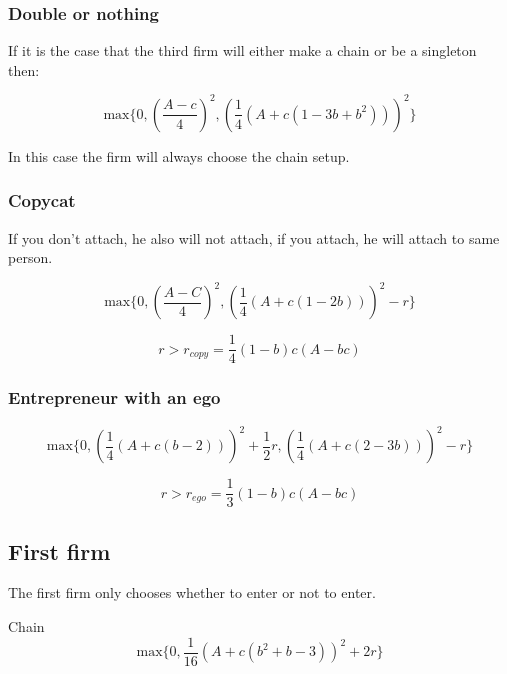 \documentclass{article}
\begin{document}
\subsubsection{Double or nothing}

If it is the case that the third firm will either make a chain or be a singleton then: 

\begin{equation*}
\text{max} \{ 
0, \left(\frac{A-c}{4} \right)^2, \left(\frac{1}{4}(A+c(1-3b+b^2)) \right)^2
\}
\end{equation*}

In this case the firm will always choose the chain setup. 

\subsubsection{Copycat}

If you don't attach, he also will not attach, if you attach, he will attach to same person. 

\begin{equation*}
\text{max} \{ 
0,  \left(\frac{A-C}{4} \right)^2, \left( \frac{1}{4}(A+c(1-2b)) \right)^2-r
\}
\end{equation*}

\begin{equation*}
r> r_{copy}=\frac{1}{4} (1-b) c (A-b c)
\end{equation*}

\subsubsection{Entrepreneur with an ego}

\begin{equation*}
\text{max} \{ 
0, \left(\frac{1}{4}(A+ c(b-2)) \right)^2+\frac{1}{2}r, \left( \frac{1}{4} (A+c(2-3b) )\right)^2-r
\}
\end{equation*}

\begin{equation*}
r> r_{ego} = \frac{1}{3} (1-b) c (A-b c)
\end{equation*}

\subsection{First firm}

The first firm only chooses whether to enter or not to enter. 

Chain
\begin{equation*}
\text{max} \{ 
0, \frac{1}{16} \left(A+c(b^2 +b-3) \right)^2+2 r
\}
\end{equation*}
\end{document}
